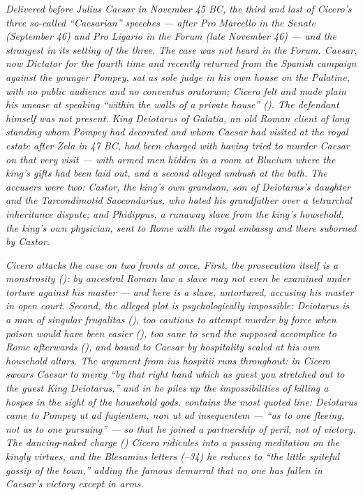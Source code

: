 
\textit{Delivered before Julius Caesar in November 45 BC, the
third and last of Cicero's three so-called ``Caesarian''
speeches --- after \textit{Pro Marcello} in the Senate
(September 46) and \textit{Pro Ligario} in the Forum (late
November 46) --- and the strangest in its setting of the three.
The case was not heard in the Forum. Caesar, now Dictator for
the fourth time and recently returned from the Spanish campaign
against the younger Pompey, sat as sole judge in his own house
on the Palatine, with no public audience and no \textit{conventus
oratorum}; Cicero felt and made plain his unease at speaking
``within the walls of a private house'' (). The
defendant himself was not present. King Deiotarus of Galatia, an
old Roman client of long standing whom Pompey had decorated and
whom Caesar had visited at the royal estate after Zela in 47 BC,
had been charged with having tried to murder Caesar on that very
visit --- with armed men hidden in a room at Blucium where the
king's gifts had been laid out, and a second alleged ambush at
the bath. The accusers were two: Castor, the king's own
grandson, son of Deiotarus's daughter and the Tarcondimotid
Saocondarius, who hated his grandfather over a tetrarchal
inheritance dispute; and Phidippus, a runaway slave from the
king's household, the king's own physician, sent to Rome with
the royal embassy and there suborned by Castor.}

\textit{Cicero attacks the case on two fronts at once. First,
the prosecution itself is a monstrosity (): by
ancestral Roman law a slave may not even be examined under
torture against his master --- and here is a slave, untortured,
accusing his master in open court. Second, the alleged plot is
psychologically impossible: Deiotarus is a man of singular
\textit{frugalitas} (), too cautious to attempt
murder by force when poison would have been easier (), too sane to send the supposed accomplice to Rome
afterwards (), and bound to Caesar by hospitality
sealed at his own household altars. The argument from
\textit{ius hospitii} runs throughout: in  Cicero
swears Caesar to mercy ``by that right hand which as guest you
stretched out to the guest King Deiotarus,'' and in
 he piles up the impossibilities of killing a
\textit{hospes} in the sight of the household gods.  contains the most quoted line: Deiotarus came to Pompey
\textit{ut ad fugientem, non ut ad insequentem} --- ``as to one
fleeing, not as to one pursuing'' --- so that he joined a
partnership of peril, not of victory. The dancing-naked charge
() Cicero ridicules into a passing meditation on
the kingly virtues, and the Blesamius letters (--34) he reduces to ``the little spiteful gossip of the
town,'' adding the famous demurral that no one has fallen in
Caesar's victory except in arms.}

